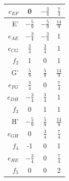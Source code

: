 \documentclass{article}
\begin{document}
\begin{center}
\begin{table}[!h]
\begin{minipage}{.5\linewidth}
\begin{tabular}{ | r | c | c | c | }
    $e_{EF}$ & 0 & $ -\frac{3}{4} $ & $ \frac{7}{4} $ \\ \hline    
    E' & $ -\frac{5}{9} $ & $ -\frac{5}{9} $ & $ \frac{14}{9} $ \\ \hline
    $e_{AE}$ & $ -\frac{3}{4} $ & $ -\frac{3}{4} $ & 1 \\ \hline    
    $e_{CG}$ & $ \frac{3}{4} $ & $ \frac{3}{4} $ & 1 \\ \hline
    $f_2$ & 1 & 0 & 1 \\ \hline
    G' & $ \frac{5}{9} $ & $ \frac{5}{9} $ & $ \frac{14}{9} $ \\ \hline
    $e_{FG}$ & $ \frac{3}{4} $ & 0 & $ \frac{7}{4} $ \\ \hline
    $e_{DH}$ & $ -\frac{3}{4} $ & $ \frac{3}{4} $ & 1 \\ \hline    
    $f_3$ & 0 & 1 & 1 \\ \hline    
    H' & $ -\frac{5}{9} $ & $ \frac{5}{9} $ & $ \frac{14}{9} $ \\ \hline
    $e_{GH}$ & 0 & $ \frac{3}{4} $ & $ \frac{7}{4} $ \\ \hline
    $f_4$ & -1 & 0 & 1 \\ \hline    
    $e_{HE}$ & $ -\frac{3}{4} $ & 0 & $ \frac{7}{4} $ \\ \hline
    $f_5$ & 0 & 0 & 2 \\ \hline
    \hline
  \end{tabular}
    \end{minipage} 
\end{table}
\end{center}
\renewcommand{\arraystretch}{1}


\end{document}
